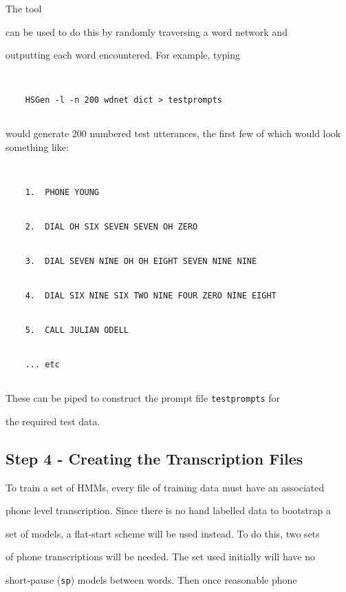 The tool


 can be used to do this by randomly traversing a word network and 


outputting each word encountered. For example, typing


\begin{verbatim}


    HSGen -l -n 200 wdnet dict > testprompts


\end{verbatim}


would generate 200 numbered test utterances, the first few of which would look something like:


\begin{verbatim}


    1.  PHONE YOUNG  


    2.  DIAL OH SIX SEVEN SEVEN OH ZERO


    3.  DIAL SEVEN NINE OH OH EIGHT SEVEN NINE NINE


    4.  DIAL SIX NINE SIX TWO NINE FOUR ZERO NINE EIGHT  


    5.  CALL JULIAN ODELL


    ... etc


\end{verbatim}


These can be piped to construct the prompt file \texttt{testprompts} for


the required test data.





\subsection{Step 4 - Creating the Transcription Files}







To train a set of HMMs, every file of training data must have an associated


phone level transcription.  Since there is no hand labelled data to bootstrap a


set of models, a flat-start scheme will be used instead.  To do this, two sets


of phone transcriptions will be needed.  The set used initially will have no


short-pause (\texttt{sp}) models between words.  Then once reasonable phone


